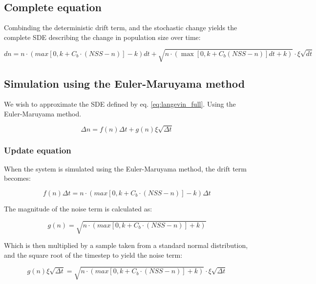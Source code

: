 \documentclass[]{article}
\begin{document}
\subsection{Complete equation}

Combinding the deterministic drift term, and the stochastic change yields the complete SDE describing the change in population size over time:

\begin{equation} \label{eq:langevin_full}
	dn = n \cdot (max[0, k + C_b \cdot (NSS-n)] - k) dt + \sqrt{n \cdot (\max [0,k+C_b (NSS-n)] dt + k)} \cdot  \xi \sqrt{dt}
\end{equation}

\subsection{Simulation using the Euler-Maruyama method}

We wish to approximate the SDE defined by eq. \ref{eq:langevin_full}. Using the  Euler-Maruyama method.

\begin{equation}
	\Delta n = f(n) \Delta t + g(n) \xi \sqrt{\Delta t}
\end{equation}

\subsubsection{Update equation}



When the system is simulated using the Euler-Maruyama method, the drift term becomes:

\begin{equation} \label{eq:term_drift} 
	f(n)\Delta t = n \cdot (max[0, k + C_b \cdot (NSS-n)] - k) \Delta t
\end{equation}

The magnitude of the noise term is calculated as:

\begin{equation} \label{eq:magnitude_noise} 
	g(n) = \sqrt{n\cdot(max[0, k + C_b \cdot (NSS-n)] + k)}
\end{equation}

Which is then multiplied by a sample taken from a standard normal distribution, and the square root of the timestep to yield the noise term:

\begin{equation} \label{eq:term_noise} 
	g(n) \xi \sqrt{\Delta t} = \sqrt{n\cdot(max[0, k + C_b \cdot (NSS-n)] + k)} \cdot  \xi \sqrt{\Delta t}
\end{equation}
\end{document}
